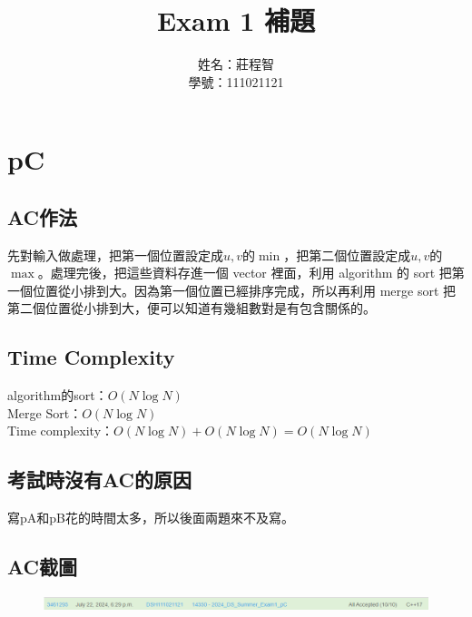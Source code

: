 \documentclass[12pt, a4paper]{article}
\title{Exam 1 補題}
\date{}
\author{姓名：莊程智 \\ 學號：111021121}
\begin{document}
\maketitle
\section*{pC}
\subsection*{AC作法}
先對輸入做處理，把第一個位置設定成$u, v$的$\min$，把第二個位置設定成$u, v$的$\max$。處理完後，把這些資料存進一個 vector 裡面，利用 algorithm 的 sort 把第一個位置從小排到大。因為第一個位置已經排序完成，所以再利用 merge sort 把第二個位置從小排到大，便可以知道有幾組數對是有包含關係的。
\subsection*{Time Complexity}
algorithm的sort：$O(N\log N)$\\
Merge Sort：$O(N\log N)$\\
Time complexity：$O(N\log N) + O(N\log N) = O(N\log N)$
\subsection*{考試時沒有AC的原因}
寫pA和pB花的時間太多，所以後面兩題來不及寫。
\subsection*{AC截圖}
\begin{figure}[h]
	\includegraphics[width=\textwidth]{pC_AC}
\end{figure}
\end{document}
